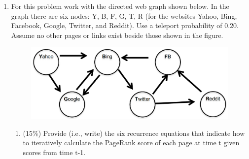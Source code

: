\documentclass[11pt]{article}
\begin{document}
\begin{enumerate}
    \item For this problem work with the directed web graph shown below. In the graph there are six nodes: Y, B, F, G, T, R (for the websites Yahoo, Bing, Facebook, Google, Twitter, and Reddit). Use a teleport probability of 0.20. Assume no other pages or links exist beside those shown in the figure.

          \begin{figure}[!ht]
              \includegraphics[scale=0.5]{graph.png}
              \centering
          \end{figure}
          \newpage

          \begin{enumerate}
              \item (15\%) Provide (i.e., write) the six recurrence equations that indicate how to iteratively calculate the PageRank score of each page at time t given scores from time t-1.


\end{enumerate}
\end{enumerate}
\end{document}
